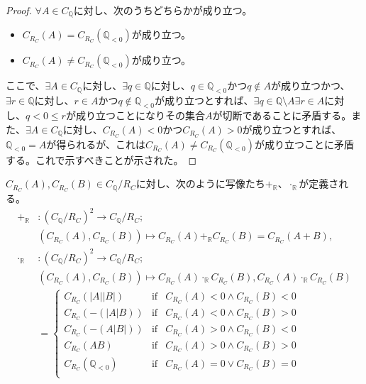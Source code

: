 \documentclass[dvipdfmx]{jsarticle}
\begin{document}
\begin{proof}
$\forall A \in C_{\mathbb{Q}}$に対し、次のうちどちらかが成り立つ。
\begin{itemize}
\item
  $C_{R_{C}}(A) = C_{R_{C}}\left( \mathbb{Q}_{< 0} \right)$が成り立つ。
\item
  $C_{R_{C}}(A) \neq C_{R_{C}}\left( \mathbb{Q}_{< 0} \right)$が成り立つ。
\end{itemize}
ここで、$\exists A \in C_{\mathbb{Q}}$に対し、$\exists q \in \mathbb{Q}$に対し、$q \in \mathbb{Q}_{< 0}$かつ$q \notin A$が成り立つかつ、$\exists r \in \mathbb{Q}$に対し、$r \in A$かつ$q \notin \mathbb{Q}_{< 0}$が成り立つとすれば、$\exists q \in \mathbb{Q} \setminus A\exists r \in A$に対し、$q < 0 \leq r$が成り立つことになりその集合$A$が切断であることに矛盾する。また、$\exists A \in C_{\mathbb{Q}}$に対し、$C_{R_{C}}(A) < 0$かつ$C_{R_{C}}(A) > 0$が成り立つとすれば、$\mathbb{Q}_{< 0} = A$が得られるが、これは$C_{R_{C}}(A) \neq C_{R_{C}}\left( \mathbb{Q}_{< 0} \right)$が成り立つことに矛盾する。これで示すべきことが示された。
\end{proof}
\begin{dfn}
$C_{R_{C}}(A),C_{R_{C}}(B) \in C_{\mathbb{Q}} /R_{C} $に対し、次のように写像たち$+_{\mathbb{R}}$、$\cdot_{\mathbb{R}}$が定義される。
\begin{align*}
+_{\mathbb{R}}&:\left( C_{\mathbb{Q}} /R_{C}  \right)^{2} \rightarrow C_{\mathbb{Q}} /R_{C} ;\\
&\left( C_{R_{C}}(A),C_{R_{C}}(B) \right) \mapsto C_{R_{C}}(A) +_{\mathbb{R}}C_{R_{C}}(B) = C_{R_{C}}(A + B),\ \ \\
\cdot_{\mathbb{R}}&:\left( C_{\mathbb{Q}} /R_{C}  \right)^{2} \rightarrow C_{\mathbb{Q}} /R_{C} ;\\
&\left( C_{R_{C}}(A),C_{R_{C}}(B) \right) \mapsto C_{R_{C}}(A) \cdot_{\mathbb{R}}C_{R_{C}}(B),C_{R_{C}}(A) \cdot_{\mathbb{R}}C_{R_{C}}(B) \\
&= \left\{ \begin{matrix}
C_{R_{C}}\left( |A||B| \right) & \mathrm{if} & C_{R_{C}}(A) < 0 \land C_{R_{C}}(B) < 0 \\
C_{R_{C}}\left( - \left( |A|B \right) \right) & \mathrm{if} & C_{R_{C}}(A) < 0 \land C_{R_{C}}(B) > 0 \\
C_{R_{C}}\left( - \left( A|B| \right) \right) & \mathrm{if} & C_{R_{C}}(A) > 0 \land C_{R_{C}}(B) < 0 \\
C_{R_{C}}(AB) & \mathrm{if} & C_{R_{C}}(A) > 0 \land C_{R_{C}}(B) > 0 \\
C_{R_{C}}\left( \mathbb{Q}_{< 0} \right) & \mathrm{if} & C_{R_{C}}(A) = 0 \vee C_{R_{C}}(B) = 0 \\
\end{matrix} \right.\ 
\end{align*}
\end{dfn}
\end{document}
